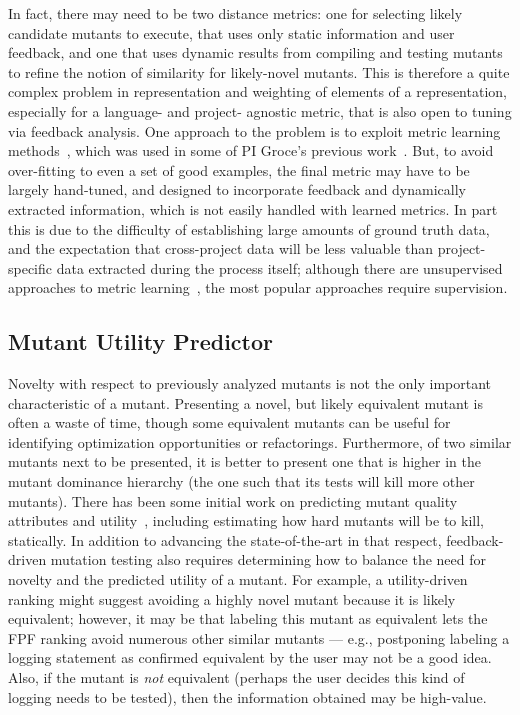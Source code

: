  In fact, there may
need to be two distance metrics:  one for selecting likely candidate
mutants to execute, that uses only static information and user
feedback, and one that uses dynamic results from compiling and testing
mutants to refine the notion of similarity for likely-novel mutants.
This is therefore a quite complex problem in representation and weighting of elements of a
representation, especially for a language- and
project- agnostic metric, that is also open to tuning via feedback
analysis.  One approach to the problem is to exploit metric learning
methods~\cite{kulis2012metric}, which was used in some of PI Groce's
previous work~\cite{SoftMining}.  But, to avoid over-fitting
to even a set of good examples, the final metric may have to be largely
hand-tuned, and designed to incorporate feedback and dynamically
extracted information, which is not easily handled with learned metrics.  In part this is due to the difficulty of establishing
large amounts of ground truth data, and the expectation that
cross-project data will be less valuable than project-specific data
extracted during the process itself; although there are unsupervised
approaches to metric
learning~\cite{scholkopf1998nonlinear,tipping1999probabilistic}, the most
popular approaches require supervision.  

\subsection{Mutant Utility Predictor}

Novelty with respect to previously analyzed mutants is not the only
important characteristic of a mutant.  Presenting a novel, but likely
equivalent mutant is often a waste of time, though some equivalent
mutants can be useful for identifying optimization opportunities or
refactorings.  Furthermore, of two similar mutants next to be presented,
it is better to present one that is higher in the mutant dominance
hierarchy (the one such that its tests will kill more other mutants).
There has been some initial work on predicting mutant quality
attributes and utility~\cite{MutQuality,FaRM}, including estimating how hard mutants
will be to kill, statically.  In addition to advancing the
state-of-the-art in that respect, feedback-driven mutation testing
also requires determining how to balance the need for novelty and the
predicted utility of a mutant.  For example, a utility-driven ranking
might suggest avoiding a highly novel mutant because it is likely
equivalent; however, it may be that labeling this mutant as equivalent
lets the FPF ranking avoid numerous other similar mutants --- e.g.,
postponing labeling a logging statement as confirmed equivalent by the
user may not be a
good idea.  Also, if the mutant is \emph{not} equivalent (perhaps the
user decides this kind of logging needs to be tested), then the
information obtained may be high-value.

